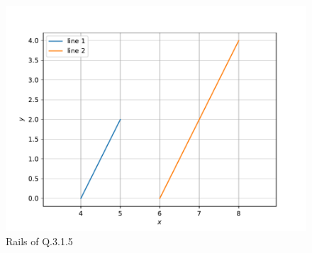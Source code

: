 \begin{enumerate}[label=\thesection.\arabic*.,ref=\thesection.\theenumi]
\begin{figure}[!ht]
	\includegraphics[width=\columnwidth]{./figs/lines/q5.pdf}
	\caption{Rails of Q.3.1.5}
	\label{fig:qfive}	
	\end{figure}
	
\end{enumerate}
